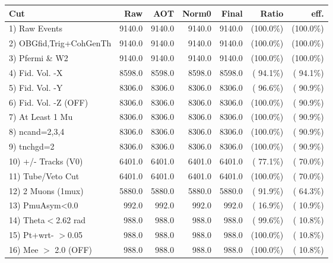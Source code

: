  \begin{table}[h!]\centering
 \begin{tabular}{||l||r|r|r|r|r|r||}
 \hline
 \hline
 Cut & Raw & AOT & Norm0 & Final & Ratio & eff.       \\
 \hline
  1) Raw Events           &       9140.0 &       9140.0 &       9140.0 &       9140.0 & (100.0\%) & (100.0\%) \\
  2) OBGfid,Trig+CohGenTh &       9140.0 &       9140.0 &       9140.0 &       9140.0 & (100.0\%) & (100.0\%) \\
  3) Pfermi \& W2         &       9140.0 &       9140.0 &       9140.0 &       9140.0 & (100.0\%) & (100.0\%) \\
  4) Fid. Vol. -X         &       8598.0 &       8598.0 &       8598.0 &       8598.0 & ( 94.1\%) & ( 94.1\%) \\
  5) Fid. Vol. -Y         &       8306.0 &       8306.0 &       8306.0 &       8306.0 & ( 96.6\%) & ( 90.9\%) \\
  6) Fid. Vol. -Z (OFF)   &       8306.0 &       8306.0 &       8306.0 &       8306.0 & (100.0\%) & ( 90.9\%) \\
  7) At Least 1 Mu        &       8306.0 &       8306.0 &       8306.0 &       8306.0 & (100.0\%) & ( 90.9\%) \\
  8) ncand=2,3,4          &       8306.0 &       8306.0 &       8306.0 &       8306.0 & (100.0\%) & ( 90.9\%) \\
  9) tnchgd=2             &       8306.0 &       8306.0 &       8306.0 &       8306.0 & (100.0\%) & ( 90.9\%) \\
 10) +/- Tracks (V0)      &       6401.0 &       6401.0 &       6401.0 &       6401.0 & ( 77.1\%) & ( 70.0\%) \\
 11) Tube/Veto Cut        &       6401.0 &       6401.0 &       6401.0 &       6401.0 & (100.0\%) & ( 70.0\%) \\
 12) 2 Muons (1mux)       &       5880.0 &       5880.0 &       5880.0 &       5880.0 & ( 91.9\%) & ( 64.3\%) \\
 13) PmuAsym<0.0          &        992.0 &        992.0 &        992.0 &        992.0 & ( 16.9\%) & ( 10.9\%) \\
 14) Theta$<$2.62 rad     &        988.0 &        988.0 &        988.0 &        988.0 & ( 99.6\%) & ( 10.8\%) \\
 15) Pt+wrt- $>$0.05      &        988.0 &        988.0 &        988.0 &        988.0 & (100.0\%) & ( 10.8\%) \\
 16) Mee $>$ 2.0  (OFF)   &        988.0 &        988.0 &        988.0 &        988.0 & (100.0\%) & ( 10.8\%) \\

\end{tabular}
\end{table}
